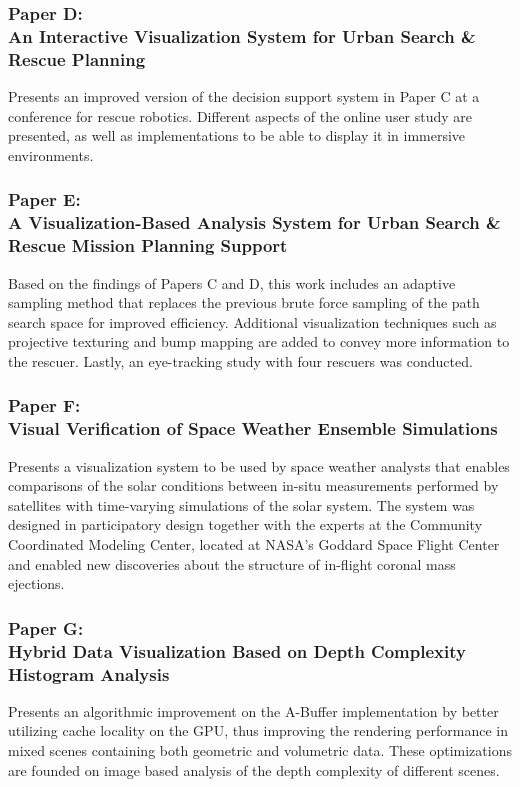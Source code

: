 \subsubsection{Paper D:\\An Interactive Visualization System for Urban Search \& Rescue Planning}
Presents an improved version of the decision support system in Paper C at a conference for rescue robotics. Different aspects of the online user study are presented, as well as implementations to be able to display it in immersive environments.%

\subsubsection{Paper E:\\A Visualization-Based Analysis System for Urban Search \& Rescue Mission Planning Support}
Based on the findings of Papers C and D, this work includes an adaptive sampling method that replaces the previous brute force sampling of the path search space for improved efficiency. Additional visualization techniques such as projective texturing and bump mapping are added to convey more information to the rescuer. Lastly, an eye-tracking study with four rescuers was conducted.%

\subsubsection{Paper F:\\Visual Verification of Space Weather Ensemble Simulations}
Presents a visualization system to be used by space weather analysts that enables comparisons of the solar conditions between in-situ measurements performed by satellites with time-varying simulations of the solar system. The system was designed in participatory design together with the experts at the Community Coordinated Modeling Center, located at NASA's Goddard Space Flight Center and enabled new discoveries about the structure of in-flight coronal mass ejections.%

\subsubsection{Paper G:\\Hybrid Data Visualization Based on Depth Complexity Histogram Analysis}
Presents an algorithmic improvement on the A-Buffer implementation by better utilizing cache locality on the GPU, thus improving the rendering performance in mixed scenes containing both geometric and volumetric data. These optimizations are founded on image based analysis of the depth complexity of different scenes.%


